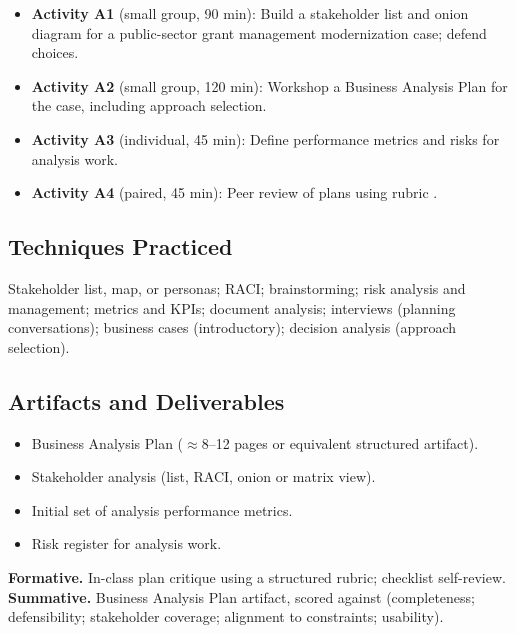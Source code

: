 \documentclass[11pt,letterpaper,oneside]{report}
\begin{document}
\begin{labbox}
\begin{itemize}
  \item \textbf{Activity A1} (small group, 90 min): Build a stakeholder list and onion diagram for a public-sector grant management modernization case; defend choices.
  \item \textbf{Activity A2} (small group, 120 min): Workshop a Business Analysis Plan for the case, including approach selection.
  \item \textbf{Activity A3} (individual, 45 min): Define performance metrics and risks for analysis work.
  \item \textbf{Activity A4} (paired, 45 min): Peer review of plans using rubric .
\end{itemize}
\end{labbox}

\subsection*{Techniques Practiced}
Stakeholder list, map, or personas; RACI; brainstorming; risk analysis and management; metrics and KPIs; document analysis; interviews (planning conversations); business cases (introductory); decision analysis (approach selection).

\subsection*{Artifacts and Deliverables}
\begin{itemize}
  \item Business Analysis Plan ($\approx$8--12 pages or equivalent structured artifact).
  \item Stakeholder analysis (list, RACI, onion or matrix view).
  \item Initial set of analysis performance metrics.
  \item Risk register for analysis work.
\end{itemize}

\begin{curriculumassessment}
\textbf{Formative.} In-class plan critique using a structured rubric; checklist self-review.\\[3pt]
\textbf{Summative.} Business Analysis Plan artifact, scored against  (completeness; defensibility; stakeholder coverage; alignment to constraints; usability).
\end{curriculumassessment}
\end{document}
